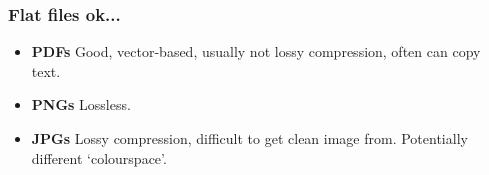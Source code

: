\subsubsection{Flat files ok...}

\begin{itemize}
    \item \textbf{PDFs} Good, vector-based, usually not lossy compression, often can copy text.
    \item \textbf{PNGs} Lossless.
    \item \textbf{JPGs} Lossy compression, difficult to get clean image from. Potentially different ‘colourspace’.
\end{itemize}


